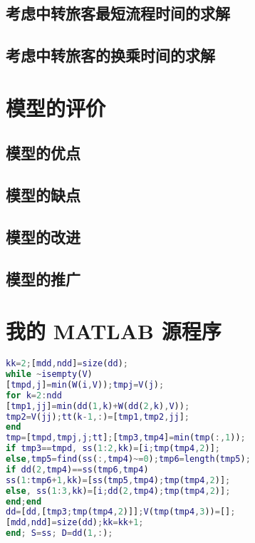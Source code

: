 \documentclass[bwprint]{gmcmthesis}
\begin{document}
\subsection{考虑中转旅客最短流程时间的求解}
\subsection{考虑中转旅客的换乘时间的求解}
\section{模型的评价}
\subsection{模型的优点}

\subsection{模型的缺点}
\subsection{模型的改进}
\subsection{模型的推广}









\newpage
\appendix
\section{我的 MATLAB 源程序}
\begin{lstlisting}[language=Matlab]%设置不同语言即可。
kk=2;[mdd,ndd]=size(dd);
while ~isempty(V)
[tmpd,j]=min(W(i,V));tmpj=V(j);
for k=2:ndd
[tmp1,jj]=min(dd(1,k)+W(dd(2,k),V));
tmp2=V(jj);tt(k-1,:)=[tmp1,tmp2,jj];
end
tmp=[tmpd,tmpj,j;tt];[tmp3,tmp4]=min(tmp(:,1));
if tmp3==tmpd, ss(1:2,kk)=[i;tmp(tmp4,2)];
else,tmp5=find(ss(:,tmp4)~=0);tmp6=length(tmp5);
if dd(2,tmp4)==ss(tmp6,tmp4)
ss(1:tmp6+1,kk)=[ss(tmp5,tmp4);tmp(tmp4,2)];
else, ss(1:3,kk)=[i;dd(2,tmp4);tmp(tmp4,2)];
end;end
dd=[dd,[tmp3;tmp(tmp4,2)]];V(tmp(tmp4,3))=[];
[mdd,ndd]=size(dd);kk=kk+1;
end; S=ss; D=dd(1,:);


 \end{lstlisting}
\end{document}
